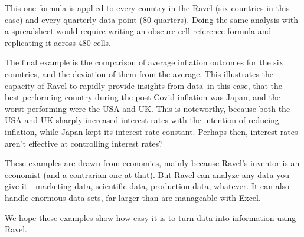 This one formula is applied to every country in the Ravel (six countries in this case) and every quarterly data point (80 quarters). Doing the same analysis with a spreadsheet would require writing an obscure cell reference formula and replicating it across 480 cells.

The final example is the comparison of average inflation outcomes for the six countries, and the deviation of them from the average. This illustrates the capacity of Ravel to rapidly provide insights from data--in this case, that the best-performing country during the post-Covid inflation was Japan, and the worst performing were the USA and UK. This is noteworthy, because both the USA and UK sharply increased interest rates with the intention of reducing inflation, while Japan kept its interest rate constant. Perhaps then, interest rates aren't effective at controlling interest rates?
\begin{center}
\end{center}

These examples are drawn from economics, mainly because Ravel's inventor is an economist (and a contrarian one at that). But Ravel can analyze any data you give it---marketing data, scientific data, production data, whatever. It can also handle enormous data sets, far larger than are manageable with Excel.

We hope these examples show how easy it is to turn data into information using Ravel.




